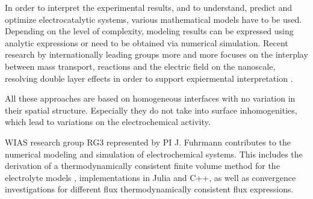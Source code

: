 \documentclass[a4paper,10pt]{article}
\begin{document}

In order to interpret the experimental results, and to understand, predict and optimize electrocatalytic systems, various mathematical models have to be used. Depending on the level of complexity, modeling results can be expressed using analytic expressions or need to be obtained via numerical simulation. Recent research by internationally leading groups more and more focuses on the interplay between mass transport, reactions and the electric field on the nanoscale, resolving double layer effects in order to support expiermental interpretation \cite{lin2019understanding,tan2018double,eden2019modeling,bohra2019modeling}.

All these approaches are based on homogeneous interfaces with no variation in their spatial structure. Especially they do not take into surface inhomogenities, which lead to variations on the electrochemical activity.



WIAS research group RG3 represented by PI J. Fuhrmann contributes to the numerical modeling and simulation of electrochemical systems. This includes  the derivation of a thermodynamically consistent finite volume method \cite{JF2016} for the electrolyte models \cite{DGL2014,VagnerEtAl2019}, implementations in Julia\cite{VoronoiFVM} and C++, as well as convergence investigations for different flux thermodynamically consistent flux expressions.   %
\end{document}
